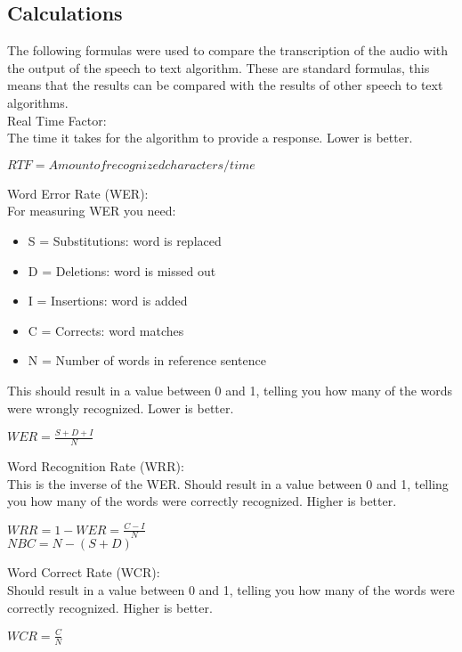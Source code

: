\documentclass{article}
\begin{document}
\subsection{Calculations}
The following formulas were used to compare the transcription of the audio with the output of the speech to text algorithm. These are standard formulas, this means that the results can be compared with the results of other speech to text algorithms. \\

    Real Time Factor: \\
    The time it takes for the algorithm to provide a response. Lower is better.
    \begin{center}
    $ RTF = Amount of recognized characters / time$ \\
    \end{center} 

    Word Error Rate (WER): \\
    For measuring WER you need:
    \begin{itemize}
        \item S = Substitutions:  word is replaced
        \item D = Deletions:  word is missed out
        \item I = Insertions:  word is added
        \item C = Corrects:  word matches
        \item N = Number of words in reference sentence
    \end{itemize}
    This should result in a value between 0 and 1, telling you how many of the words were wrongly recognized. Lower is better.
    \begin{center}
    $ WER = \frac{S + D + I}{N}$ \\
    \end{center} 
    
    Word Recognition Rate (WRR): \\
    This is the inverse of the WER. Should result in a value between 0 and 1, telling you how many of the words were correctly recognized. Higher is better.
    \begin{center}
    $ WRR = 1 - WER = \frac{C - I}{N}$ \\
    $ NBC =N - (S + D)$ \\
    \end{center} 
    
    Word Correct Rate (WCR): \\
    Should result in a value between 0 and 1, telling you how many of the words were correctly recognized. Higher is better.
    \begin{center}
    $ WCR = \frac{C}{N}$ \\
    \end{center} 
    
\end{document}
